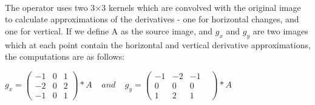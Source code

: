 \documentclass{article}
\begin{document}
		\paragraph{}
		The operator uses two 3×3 kernels which are convolved with the original image to calculate approximations of the derivatives - one for horizontal changes, and one for vertical. If we define A as the source image, and $g_{x}$ and $g_{y}$ are two images which at each point contain the horizontal and vertical derivative approximations, the computations are as follows:

		$g_{x} = 
		\left(
		\begin{matrix}
		-1 & 0 & 1 \\
		-2 & 0 & 2 \\
		-1 & 0 & 1
		\end{matrix}
		\right)
		*A\ \ \ \ \
		and
		\ \ \ \ \ 
		g_{y} = 
		\left(
		\begin{matrix}
		-1&  -2&  -1& \\
		 0&   0&   0& \\
		 1&   2&   1&
		\end{matrix}
		\right)
		*A
		$
\end{document}
